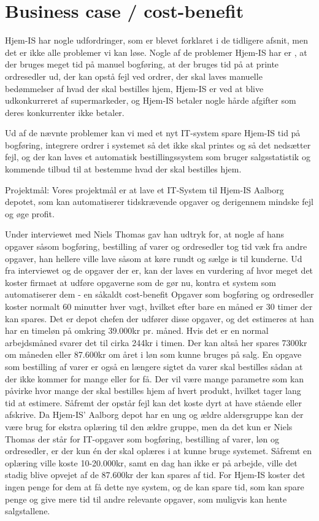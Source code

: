 \section{Business case / cost-benefit}\label{businesscase}
Hjem-IS har nogle udfordringer, som er blevet forklaret i de tidligere afsnit, men det er ikke alle problemer vi kan løse. Nogle af de problemer Hjem-IS har er , at der bruges meget tid på manuel bogføring, at der bruges tid på at printe ordresedler ud, der kan opstå fejl ved ordrer, der skal laves manuelle bedømmelser af hvad der skal bestilles hjem, Hjem-IS er ved at blive udkonkurreret af supermarkeder, og Hjem-IS betaler nogle hårde afgifter som deres konkurrenter ikke betaler.

Ud af de nævnte problemer kan vi med et nyt IT-system spare Hjem-IS tid på bogføring, integrere ordrer i systemet så det ikke skal printes og så det nedsætter fejl, og der kan laves et automatisk bestillingssystem som bruger salgsstatistik og kommende tilbud til at bestemme hvad der skal bestilles hjem. 

Projektmål:
Vores projektmål er at lave et IT-System til Hjem-IS Aalborg depotet, som kan automatiserer tidskrævende opgaver og derigennem mindske fejl og øge profit.

Under interviewet med Niels Thomas gav han udtryk for, at nogle af hans opgaver såsom bogføring, bestilling af varer og ordresedler tog tid væk fra andre opgaver, han hellere ville lave såsom at køre rundt og sælge is til kunderne. 
Ud fra interviewet og de opgaver der er, kan der laves en vurdering af hvor meget det koster firmaet at udføre opgaverne som de gør nu, kontra et system som automatiserer dem - en såkaldt cost-benefit\cite{Costbenefit}
Opgaver som bogføring og ordresedler koster normalt 60 minutter hver vagt, hvilket efter bare en måned er 30 timer der kan spares. Det er depot chefen der udfører disse opgaver, og det estimeres at han har en timeløn på omkring 39.000kr pr. måned. Hvis det er en normal arbejdsmåned svarer det til cirka 244kr i timen. Der kan altså her spares 7300kr om måneden eller 87.600kr om året i løn som kunne bruges på salg. 
En opgave som bestilling af varer er også en længere sigtet da varer skal bestilles sådan at der ikke kommer for mange eller for få. Der vil være mange parametre som kan påvirke hvor mange der skal bestilles hjem af hvert produkt, hvilket tager lang tid at estimere. Såfremt der opstår fejl kan det koste dyrt at have stående eller afskrive. 
Da Hjem-IS’ Aalborg depot har en ung og ældre aldersgruppe kan der være brug for ekstra oplæring til den ældre gruppe, men da det kun er Niels Thomas der står for IT-opgaver som bogføring, bestilling af varer, løn og ordresedler, er der kun én der skal oplæres i at kunne bruge systemet. Såfremt en oplæring ville koste 10-20.000kr, samt en dag han ikke er på arbejde, ville det stadig blive opvejet af de 87.600kr der kan spares af tid.
For Hjem-IS koster det ingen penge for dem at få dette nye system, og de kan spare tid, som kan spare penge og give mere tid til andre relevante opgaver, som muligvis kan hente salgstallene.

